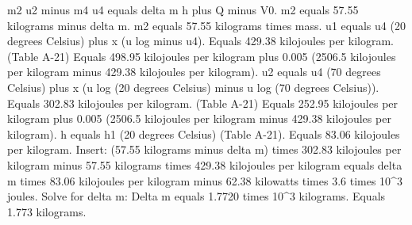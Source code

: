 m2 u2 minus m4 u4 equals delta m h plus Q minus V0.  
m2 equals 57.55 kilograms minus delta m.  
m2 equals 57.55 kilograms times mass.  
u1 equals u4 (20 degrees Celsius) plus x (u log minus u4).  
Equals 429.38 kilojoules per kilogram.  
(Table A-21)  
Equals 498.95 kilojoules per kilogram plus 0.005 (2506.5 kilojoules per kilogram minus 429.38 kilojoules per kilogram).  
u2 equals u4 (70 degrees Celsius) plus x (u log (20 degrees Celsius) minus u log (70 degrees Celsius)).  
Equals 302.83 kilojoules per kilogram.  
(Table A-21)  
Equals 252.95 kilojoules per kilogram plus 0.005 (2506.5 kilojoules per kilogram minus 429.38 kilojoules per kilogram).  
h equals h1 (20 degrees Celsius) (Table A-21).  
Equals 83.06 kilojoules per kilogram.  
Insert:  
(57.55 kilograms minus delta m) times 302.83 kilojoules per kilogram minus 57.55 kilograms times 429.38 kilojoules per kilogram equals delta m times 83.06 kilojoules per kilogram minus 62.38 kilowatts times 3.6 times 10^3 joules.  
Solve for delta m:  
Delta m equals 1.7720 times 10^3 kilograms.  
Equals 1.773 kilograms.